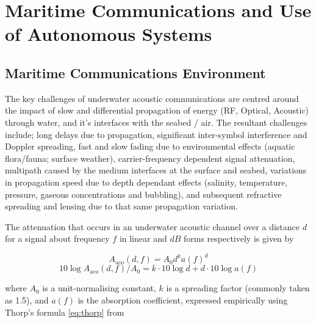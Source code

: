  \def\ChapterTitle{Maritime Communications and Use of Autonomous Systems}
 
 \ifx\ifthesis\undefined
 
 \else
 \chapter{\ChapterTitle}
 \label{Chapter\thechapter}
 \fi
 
 
 \section{Maritime Communications Environment}\label{sec:trust_in_marine}
 
 The key challenges of underwater acoustic communications are centred around the impact of slow and differential propagation of energy (RF, Optical, Acoustic) through water, and it's interfaces with the seabed / air.
 The resultant challenges include; long delays due to propagation, significant inter-symbol interference and Doppler spreading, fast and slow fading due to environmental effects (aquatic flora/fauna; surface weather), carrier-frequency dependent signal attenuation, multipath caused by the medium interfaces at the surface and seabed, variations in propagation speed due to depth dependant effects (salinity, temperature, pressure, gaseous concentrations and bubbling), and subsequent refractive spreading and lensing due to that same propagation variation\cite{Partan2006}.
 
 The attenuation that occurs in an underwater acoustic channel over a distance $d$ for a signal about frequency $f$ in linear and $dB$ forms respectively is given by
 
 \begin{equation}
 \label{eq:acoattenuation}
 A_{\text{aco}}(d,f) = A_0d^ka(f)^d
 \end{equation}
 \begin{equation}
 \label{eq:acoattenuationdb}
 10 \log A_{\text{aco}}(d,f)/A_0 = k \cdot 10 \log d + d \cdot 10 \log a(f)
 \end{equation}
 
 where $A_0$ is a unit-normalising constant, $k$ is a spreading factor (commonly taken as 1.5), and $a(f)$ is the absorption coefficient, expressed empirically using Thorp's formula \eqref{eq:thorp} from \cite{Stojanovic2007}
 
